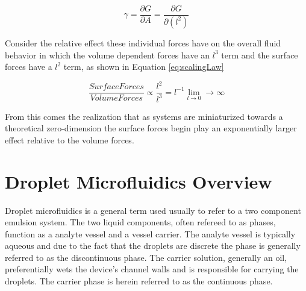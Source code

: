 \begin{equation}
\gamma = \frac{\partial G}{\partial A} = \frac{\partial G}{\partial (l^2)}
\label{eq:interfacial}
\end{equation}


Consider the relative effect these individual forces have on the overall fluid behavior in which the volume dependent forces have an $l^3$ term and the surface forces have a $l^2$ term, as shown in Equation \vref{eq:scalingLaw} \cite{Bruus2008}

\begin{equation}
\frac{Surface Forces}{Volume Forces} \propto \frac{l^2}{l^3} = l^{-1} \lim_{l \to 0}  \rightarrow \infty
\label{eq:scalingLaw}
\end{equation}

From this comes the realization that as systems are miniaturized towards a theoretical zero-dimension the surface forces begin play an exponentially larger effect relative to the volume forces.



\section{Droplet Microfluidics Overview}

Droplet microfluidics is a general term used usually to refer to a two component emulsion system. The two liquid components, often refereed to as phases, function as a analyte vessel and a vessel carrier. The analyte vessel is typically aqueous and due to the fact that the droplets are discrete the phase is generally referred to as the discontinuous phase. The carrier solution, generally an oil, preferentially wets the device's channel walls and is responsible for carrying the droplets. The carrier phase is herein referred to as the continuous phase. \cite{Kaminski2016}

